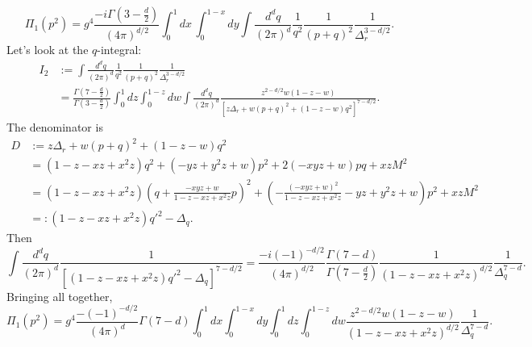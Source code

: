 \documentclass[10pt]{article}
\theoremstyle{definition}
\theoremstyle{remark}
\begin{document}
	\[\Pi_{1}(p^{2})=g^{4}\frac{-i\Gamma(3-\frac{d}{2})}{(4\pi)^{d/2}}\int_{0}^{1}dx\,\int_{0}^{1-x}dy\int\frac{d^{d}q}{(2\pi)^{d}}\frac{1}{q^{2}}\frac{1}{(p+q)^{2}}\frac{1}{\Delta_{r}^{3-d/2}}.\]
	Let's look at the $q$-integral:
	\begin{align*}
		I_{2}&:=\int\frac{d^{d}q}{(2\pi)^{d}}\frac{1}{q^{2}}\frac{1}{(p+q)^{2}}\frac{1}{\Delta_{r}^{3-d/2}}\\
		&=\frac{\Gamma(7-\frac{d}{2})}{\Gamma(3-\frac{d}{2})}\int_{0}^{1}dz\int_{0}^{1-z}dw\int\frac{d^{d}q}{(2\pi)^{d}}\frac{z^{2-d/2}w(1-z-w)}{[z\Delta_{r}+w(p+q)^{2}+(1-z-w)q^{2}]^{7-d/2}}.
	\end{align*}
	The denominator is
	\begin{align*}
		D&:=z\Delta_{r}+w(p+q)^{2}+(1-z-w)q^{2}\\
		&=(1-z-xz+x^{2}z)q^{2}+(-yz+y^{2}z+w)p^{2}+2(-xyz+w)pq+xzM^{2}\\
		&=(1-z-xz+x^{2}z)\left(q+\frac{-xyz+w}{1-z-xz+x^{2}z}p\right)^{2}+\left(-\frac{(-xyz+w)^{2}}{1-z-xz+x^{2}z}-yz+y^{2}z+w\right)p^{2}+xzM^{2}\\
		&=:(1-z-xz+x^{2}z)q'^{2}-\Delta_{q}.
	\end{align*}
	Then
	\[\int\frac{d^{d}q}{(2\pi)^{d}}\frac{1}{[(1-z-xz+x^{2}z)q'^{2}-\Delta_{q}]^{7-d/2}}=\frac{-i(-1)^{-d/2}}{(4\pi)^{d/2}}\frac{\Gamma(7-d)}{\Gamma(7-\frac{d}{2})}\frac{1}{(1-z-xz+x^{2}z)^{d/2}}\frac{1}{\Delta_{q}^{7-d}}.\]
	Bringing all together,
	\[\Pi_{1}(p^{2})=g^{4}\frac{-(-1)^{-d/2}}{(4\pi)^{d}}\Gamma(7-d)\int_{0}^{1}dx\int_{0}^{1-x}dy\int_{0}^{1}dz\int_{0}^{1-z}dw\frac{z^{2-d/2}w(1-z-w)}{(1-z-xz+x^{2}z)^{d/2}}\frac{1}{\Delta_{q}^{7-d}}.\]
\end{document}

